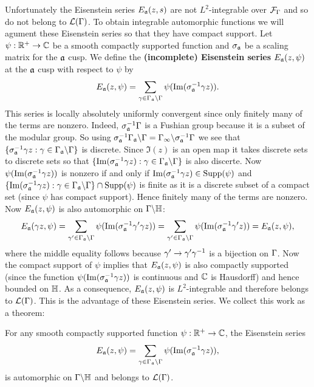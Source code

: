       Unfortunately the Eisenstein series $E_{\mathfrak{a}}(z,s)$ are not $L^{2}$-integrable over $\mathcal{F}_{\Gamma}$ and so do not belong to $\mathcal{L}(\Gamma)$. To obtain integrable automorphic functions we will agument these Eisenstein series so that they have compact support. Let $\psi:\mathbb{R}^{+} \to \mathbb{C}$ be a smooth compactly supported function and $\sigma_{\mathfrak{a}}$ be a scaling matrix for the $\mathfrak{a}$ cusp. We define the \textbf{(incomplete) Eisenstein series} $E_{\mathfrak{a}}(z,\psi)$ at the $\mathfrak{a}$ cusp with respect to $\psi$ by
      \[
        E_{\mathfrak{a}}(z,\psi) = \sum_{\gamma \in \Gamma_{\mathfrak{a}}\backslash\Gamma}\psi(\mathrm{Im}(\sigma_{\mathfrak{a}}^{-1}\gamma z)).
      \]
      This series is locally absolutely uniformly convergent since only finitely many of the terms are nonzero. Indeed, $\sigma_{\mathfrak{a}}^{-1}\Gamma$ is a Fushian group because it is a subset of the modular group. So using $\sigma_{\mathfrak{a}}^{-1}\Gamma_{\mathfrak{a}}\backslash\Gamma = \Gamma_{\infty}\backslash\sigma_{\mathfrak{a}}^{-1}\Gamma$ we see that $\{\sigma_{\mathfrak{a}}^{-1}\gamma z:\gamma \in \Gamma_{\mathfrak{a}}\backslash\Gamma\}$ is discrete. Since $\Im(z)$ is an open map it takes discrete sets to discrete sets so that $\{\mathrm{Im}(\sigma_{\mathfrak{a}}^{-1}\gamma z):\gamma \in \Gamma_{\mathfrak{a}}\backslash\Gamma\}$ is also discerte. Now $\psi(\mathrm{Im}(\sigma_{\mathfrak{a}}^{-1}\gamma z))$ is nonzero if and only if $\mathrm{Im}(\sigma_{\mathfrak{a}}^{-1}\gamma z) \in \mathrm{Supp}(\psi)$ and $\{\mathrm{Im}(\sigma_{\mathfrak{a}}^{-1}\gamma z):\gamma \in \Gamma_{\mathfrak{a}}\backslash\Gamma\} \cap \mathrm{Supp}(\psi)$ is finite as it is a discrete subset of a compact set (since $\psi$ has compact support). Hence finitely many of the terms are nonzero. Now $E_{\mathfrak{a}}(z,\psi)$ is also automorphic on $\Gamma\backslash\mathbb{H}$:
      \[
        E_{\mathfrak{a}}(\gamma z,\psi) = \sum_{\gamma' \in \Gamma_{\mathfrak{a}}\backslash\Gamma}\psi(\mathrm{Im}(\sigma_{\mathfrak{a}}^{-1}\gamma'\gamma z)) = \sum_{\gamma' \in \Gamma_{\mathfrak{a}}\backslash\Gamma}\psi(\mathrm{Im}(\sigma_{\mathfrak{a}}^{-1}\gamma' z)) = E_{\mathfrak{a}}(z,\psi),
      \]
      where the middle equality follows because $\gamma' \to \gamma'\gamma^{-1}$ is a bijection on $\Gamma$. Now the compact support of $\psi$ implies that $E_{\mathfrak{a}}(z,\psi)$ is also compactly supported (since the function $\psi(\mathrm{Im}(\sigma_{\mathfrak{a}}^{-1}\gamma z))$ is continuous and $\mathbb{C}$ is Hausdorff) and hence bounded on $\mathbb{H}$. As a consequence, $E_{\mathfrak{a}}(z,\psi)$ is $L^{2}$-integrable and therefore belongs to $\mathcal{L}(\Gamma)$. This is the advantage of these Eisenstein series. We collect this work as a theorem:

      \begin{theorem}
        For any smooth compactly supported function $\psi:\mathbb{R}^{+} \to \mathbb{C}$, the Eisenstein series
        \[
          E_{\mathfrak{a}}(z,\psi) = \sum_{\gamma \in \Gamma_{\mathfrak{a}}\backslash\Gamma}\psi(\mathrm{Im}(\sigma_{\mathfrak{a}}^{-1}\gamma z)),
        \]
        is automorphic on $\Gamma\backslash\mathbb{H}$ and belongs to $\mathcal{L}(\Gamma)$.
      \end{theorem}
      
